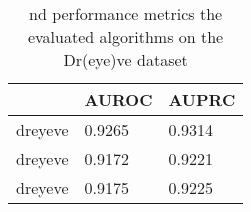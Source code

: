 \begin{table}[]
\begin{tabular}{|l|l|l|}
\hline
      & AUROC & AUPRC \\ \hline
dreyeve & 0.9265  & 0.9314  \\ \hline
dreyeve & 0.9172  & 0.9221  \\ \hline
dreyeve & 0.9175  & 0.9225  \\ \hline
\end{tabular}
\caption{\gls{nd} performance metrics the evaluated algorithms on the Dr(eye)ve dataset}
\label{tab:results dreyeve}
\end{table}
